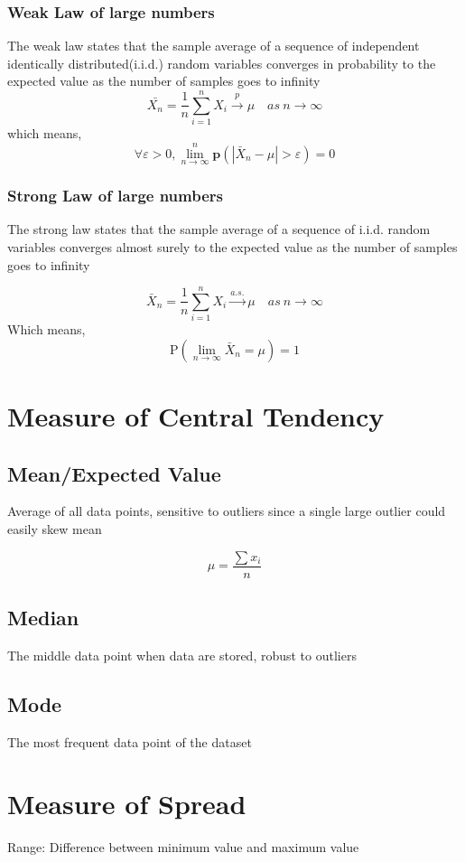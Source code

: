 \documentclass[12pt]{extarticle}
\begin{document}
\subsubsection{Weak Law of large numbers}
The weak law states that the sample average of a sequence of independent identically distributed(i.i.d.) random variables converges in probability to the expected value as the number of samples goes to infinity
$$\bar{X_n} = \frac{1}{n}\sum_{i=1}^{n}X_i \xrightarrow{p} \mu \quad as \ n \to \infty $$
which means, 
$$\forall \varepsilon>0, \lim_{n \to \infty}^n \mathbf{p}(|\bar{X}_n-\mu| > \varepsilon) = 0 $$
\subsubsection{Strong Law of large numbers}
The strong law states that the sample average of a sequence of i.i.d. random variables converges almost surely to the expected value as the number of samples goes to infinity 

$$\bar{X}_n = \frac{1}{n} \sum_{i=1}^n X_i \xrightarrow{a.s.} \mu \quad as\ n \to \infty$$
Which means, 
$$ \mathrm{P}(\lim_{n \to \infty} \bar{X}_n = \mu ) = 1 $$

\section{Measure of Central Tendency} 

\subsection{Mean/Expected Value} 
Average of all data points, sensitive to outliers since a single large outlier could easily skew mean 

$$ \mu = \frac{\sum x_i}{n} $$ 

\subsection{Median}
The middle data point when data are stored, robust to outliers 

\subsection{Mode}
The most frequent data point of the dataset  

\section{Measure of Spread}
Range: Difference between minimum value and maximum value 
\end{document}
